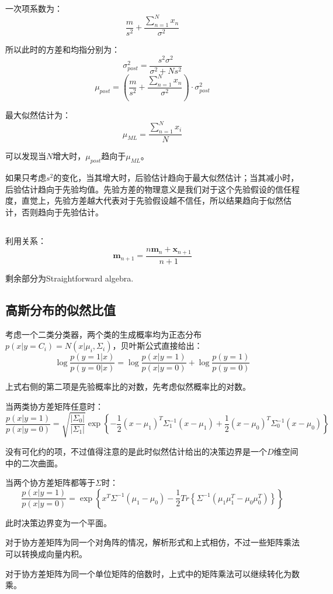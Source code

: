 \documentclass[UTF8]{ctexart}
\begin{document}
一次项系数为：
$$\frac{m}{s^{2}}+\frac{\sum_{n=1}^{N}x_{n}}{\sigma^{2}}$$

所以此时的方差和均指分别为：
$$\sigma^{2}_{post} = \frac{s^{2}\sigma^{2}}{\sigma^{2}+Ns^{2}}$$
$$\mu_{post} = (\frac{m}{s^{2}}+\frac{\sum_{n=1}^{N}x_{n}}{\sigma^{2}})\cdot \sigma^{2}_{post}$$

最大似然估计为：
$$\mu_{ML}=\frac{\sum_{n=1}^{N}x_{i}}{N}$$

可以发现当$N$增大时，$\mu_{post}$趋向于$\mu_{ML}$。

如果只考虑$s^{2}$的变化，当其增大时，后验估计趋向于最大似然估计；当其减小时，后验估计趋向于先验均值。先验方差的物理意义是我们对于这个先验假设的信任程度，直觉上，先验方差越大代表对于先验假设越不信任，所以结果趋向于似然估计，否则趋向于先验估计。

\subsection{}
利用关系：
$$\textbf{m}_{n+1}=\frac{n\textbf{m}_{n}+\textbf{x}_{n+1}}{n+1}$$

剩余部分为Straightforward algebra.

\subsection{高斯分布的似然比值}
考虑一个二类分类器，两个类的生成概率均为正态分布$p(x|y=C_{i})=N(x|\mu_{i},\Sigma_{i})$，贝叶斯公式直接给出：
$$\log \frac{p(y=1|x)}{p(y=0|x)} = \log \frac{p(x|y=1)}{p(x|y=0)} + \log \frac{p(y=1)}{p(y=0)}$$

上式右侧的第二项是先验概率比的对数，先考虑似然概率比的对数。

当两类协方差矩阵任意时：
$$\frac{p(x|y=1)}{p(x|y=0)} = \sqrt{\frac{|\Sigma_{0}|}{|\Sigma_{1}|}}\exp\left\{ -\frac{1}{2}(x-\mu_{1})^{T}\Sigma_{1}^{-1}(x-\mu_{1}) + \frac{1}{2}(x-\mu_{0})^{T}\Sigma_{0}^{-1}(x-\mu_{0}) \right\}$$

没有可化约的项，不过值得注意的是此时似然估计给出的决策边界是一个$D$维空间中的二次曲面。

当两个协方差矩阵都等于$\Sigma$时：
$$\frac{p(x|y=1)}{p(x|y=0)} = \exp\left\{x^{T}\Sigma^{-1}(\mu_{1}-\mu_{0})-\frac{1}{2}Tr\left\{ \Sigma^{-1}(\mu_{1}\mu_{1}^{T}-\mu_{0}\mu_{0}^{T}) \right\} \right\}$$

此时决策边界变为一个平面。

对于协方差矩阵为同一个对角阵的情况，解析形式和上式相仿，不过一些矩阵乘法可以转换成向量内积。

对于协方差矩阵为同一个单位矩阵的倍数时，上式中的矩阵乘法可以继续转化为数乘。
\end{document}
